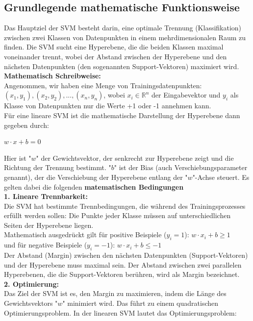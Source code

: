 \documentclass[12pt]{article}
\begin{document}
\subsection{Grundlegende mathematische Funktionsweise}
Das Hauptziel der SVM besteht darin, eine optimale Trennung (Klassifikation) zwischen zwei Klassen von Datenpunkten in einem mehrdimensionalen Raum zu finden. Die SVM sucht eine Hyperebene, die die beiden Klassen maximal voneinander trennt, wobei der Abstand zwischen der Hyperebene und den nächsten Datenpunkten (den sogenannten Support-Vektoren) maximiert wird.
\\
\textbf{Mathematisch Schreibweise:}
\\Angenommen, wir haben eine Menge von Trainingsdatenpunkten: ${(x_1, y_1), (x_2, y_2),... , (x_n, y_n)}$, wobei $x_i \in \mathbb{R}^n$ der Eingabevektor und $y_i$ als Klasse von Datenpunkten nur die Werte +1 oder -1 annehmen kann.\\
Für eine lineare SVM ist die mathematische Darstellung der Hyperebene dann gegeben durch:
\begin{center}
\begin{large} \textbf{$w \cdot x + b = 0$} \end{large} 
\end{center}
Hier ist "$w$" der Gewichtsvektor, der senkrecht zur Hyperebene zeigt und die Richtung der Trennung bestimmt. "$b$" ist der Bias (auch Verschiebungsparameter genannt), der die Verschiebung der Hyperebene entlang der "$w$"-Achse steuert. Es gelten dabei die folgenden \textbf{matematischen Bedingungen}\\
\textbf{1. Lineare Trennbarkeit:}\\
Die SVM hat bestimmte Trennbedingungen, die während des Trainingsprozesses erfüllt werden sollen:
Die Punkte jeder Klasse müssen auf unterschiedlichen Seiten der Hyperebene liegen.\\
Mathematisch ausgedrückt gilt für positive Beispiele ($y_i = 1$): $w \cdot x_i + b \geq 1$\\
und für negative Beispiele ($y_i = -1$): $w \cdot x_i + b \leq -1$\\
Der Abstand (Margin) zwischen den nächsten Datenpunkten (Support-Vektoren) und der Hyperebene muss maximal sein. Der Abstand zwischen zwei parallelen Hyperebenen, die die Support-Vektoren berühren, wird als Margin bezeichnet.\\
\textbf{2. Optimierung:}\\Das Ziel der SVM ist es, den Margin zu maximieren, indem die Länge des Gewichtsvektors "$w$" minimiert wird. Das führt zu einem quadratischen Optimierungsproblem. In der linearen SVM lautet das Optimierungsproblem:
\end{document}
